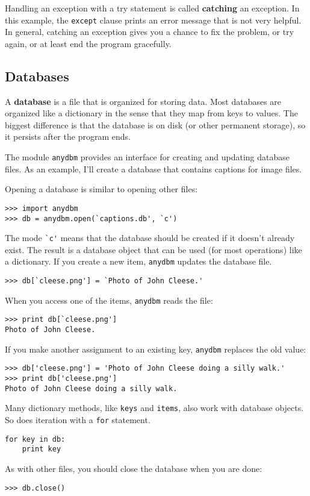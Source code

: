 \documentclass{article}
\begin{document}
\begin{multicols}{2}
Handling an exception with a try statement is called {\bf catching} an
exception. In this example, the \verb|except| clause prints an error message
that is not very helpful. In general, catching an exception gives you
a chance to fix the problem, or try again, or at least end the program
gracefully.

\subsection{Databases}
A {\bf database} is a file that is organized for storing data. Most
databases are organized like a dictionary in the sense that they map
from keys to values. The biggest difference is that the database is on
disk (or other permanent storage), so it persists after the program
ends.

The module \verb|anydbm| provides an interface for creating and
updating database files. As an example, I'll create a database that
contains captions for image files.

Opening a database is similar to opening other files:
\begin{lstlisting}
>>> import anydbm
>>> db = anydbm.open(`captions.db', `c')
\end{lstlisting}
The mode \verb|`c'| means that the database should be created if it
doesn't already exist. The result is a database object that can be
used (for most operations) like a dictionary. If you create a new
item, \verb|anydbm| updates the database file.
\begin{lstlisting}
>>> db[`cleese.png'] = `Photo of John Cleese.'
\end{lstlisting}
When you access one of the items, \verb|anydbm| reads the file:
\begin{lstlisting}
>>> print db[`cleese.png']
Photo of John Cleese.
\end{lstlisting}
If you make another assignment to an existing key, \verb|anydbm|
replaces the old value:
\begin{lstlisting}
>>> db['cleese.png'] = 'Photo of John Cleese doing a silly walk.'
>>> print db['cleese.png']
Photo of John Cleese doing a silly walk.
\end{lstlisting}
Many dictionary methods, like \verb|keys| and \verb|items|, also work
with database objects. So does iteration with a \verb|for| statement.
\begin{lstlisting}
for key in db:
    print key
\end{lstlisting}
As with other files, you should close the database when you are done:
\begin{lstlisting}
>>> db.close()
\end{lstlisting}


\end{multicols}
\end{document}
